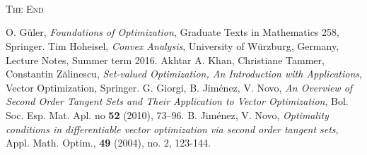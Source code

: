 \documentclass[a4paper]{article}
\numberwithin{equation}{section}
\begin{document}
\\
\\
\\
\begin{center}
\textsc{The End}
\end{center}
\newpage
\begin{thebibliography}{999}
 O. G\"{u}ler, \textit{Foundations of Optimization}, Graduate Texts in Mathematics 258, Springer.
 Tim Hoheisel, \textit{Convex Analysis}, University of W\"{u}rzburg, Germany, Lecture Notes, Summer term 2016.
 Akhtar A. Khan, Christiane Tammer, Constantin Z\u{a}linescu, \textit{Set-valued Optimization, An Introduction with Applications}, Vector Optimization, Springer.
 G. Giorgi, B. Jim\'{e}nez, V. Novo, \textit{An Overview of Second Order Tangent Sets and Their Application to Vector Optimization}, Bol. Soc. Esp. Mat. Apl. no \textbf{52} (2010), 73–96.
 B. Jim\'{e}nez, V. Novo, \textit{Optimality conditions in differentiable vector optimization via second order tangent sets}, Appl. Math. Optim., \textbf{49} (2004), no. 2, 123-144.
\end{thebibliography}
\end{document}
